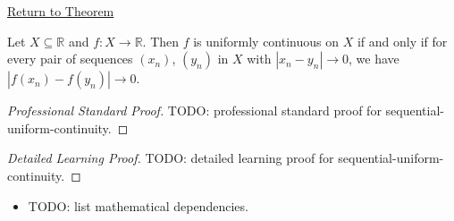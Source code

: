 \newpage
{}
\label{prf:sequential-uniform-continuity}

\begin{remark*}[Return]
\hyperref[prop:sequential-uniform-continuity]{Return to Theorem}
\end{remark*}

\begin{proposition*}
Let $X \subseteq \mathbb{R}$ and $f : X \to \mathbb{R}$.
Then $f$ is uniformly continuous on $X$ if and only if
for every pair of sequences $(x_n)$, $(y_n)$ in $X$ with
$|x_n - y_n| \to 0$, we have $|f(x_n) - f(y_n)| \to 0$.
\end{proposition*}

\begin{proof}[Professional Standard Proof]
\LRAProofBodyStart
TODO: professional standard proof for sequential-uniform-continuity.
\end{proof}

\begin{proof}[Detailed Learning Proof]
\LRAProofBodyStart
TODO: detailed learning proof for sequential-uniform-continuity.
\end{proof}

\begin{remark*}
\end{remark*}

\begin{dependencies}
\begin{itemize}
  \item TODO: list mathematical dependencies.
\end{itemize}
\end{dependencies}

\clearpage
